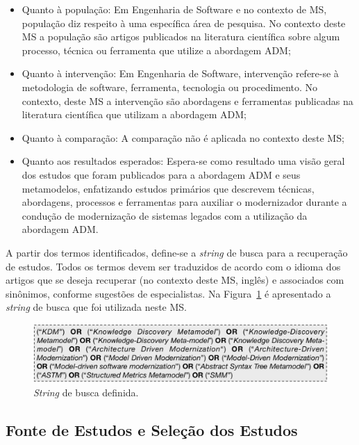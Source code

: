 \begin{itemize}
\item Quanto à população: Em Engenharia de Software e no contexto de MS, população diz respeito à uma específica área de pesquisa. No contexto deste MS a população são artigos publicados na literatura científica sobre algum processo, técnica ou ferramenta que utilize a  abordagem ADM;

\item Quanto à intervenção: Em Engenharia de Software, intervenção refere-se à metodologia de software, ferramenta, tecnologia ou procedimento. No contexto, deste MS a intervenção são abordagens e ferramentas publicadas na literatura científica que utilizam a abordagem ADM;

\item Quanto à comparação: A comparação não é aplicada no contexto deste MS;

\item Quanto aos resultados esperados: Espera-se como resultado uma visão geral dos estudos que foram publicados para a abordagem ADM e seus metamodelos, enfatizando estudos primários que descrevem técnicas, abordagens, processos e ferramentas para auxiliar o modernizador durante a condução de modernização de sistemas legados com a utilização da abordagem ADM.

\end{itemize}

A partir dos termos identificados, define-se a \textit{string} de busca para a recuperação de estudos. Todos os termos devem ser traduzidos de acordo com o idioma dos artigos que se deseja recuperar (no contexto deste MS, inglês) e associados com sinônimos, conforme sugestões de especialistas. Na Figura~\ref{fig:string_de_busca} é apresentado a \textit{string} de busca que foi utilizada neste MS.

\begin{figure}[h]
 \caption{\textit{String} de busca definida.}
 \label{fig:string_de_busca}
 \centering
 \includegraphics[scale=0.6]{images/searchStringMS}
 \fautor
\end{figure}

\subsection{Fonte de Estudos e Seleção dos Estudos}

